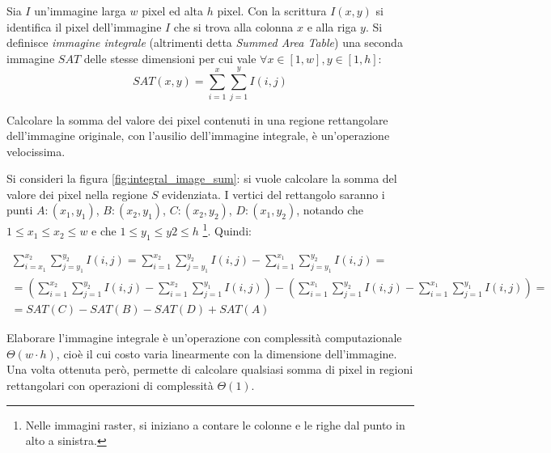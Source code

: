         \begin{definition}
            Sia $I$ un'immagine larga $w$ pixel ed alta $h$ pixel. Con la scrittura $I(x, y)$ si identifica il pixel dell'immagine $I$ che si trova alla colonna $x$ e alla riga $y$.
            Si definisce \emph{immagine integrale} (altrimenti detta \emph{Summed Area Table}) una seconda immagine $SAT$ delle stesse dimensioni per cui vale $\forall x \in [1,w], y \in [1,h]$:
            \begin{equation}
                SAT(x, y) = \sum_{i = 1}^{x} \sum_{j = 1}^{y} I(i, j)
            \end{equation}
        \end{definition}

        Calcolare la somma del valore dei pixel contenuti in una regione rettangolare dell'immagine originale, con l'ausilio dell'immagine integrale, è un'operazione velocissima.

        Si consideri la figura \ref{fig:integral_image_sum}: si vuole calcolare la somma del valore dei pixel nella regione $S$ evidenziata. I vertici del rettangolo saranno i punti $A:(x_1,y_1)$, $B:(x_2,y_1)$, $C:(x_2,y_2)$, $D:(x_1, y_2)$, notando che $1 \leq x_1 \leq x_2 \leq w$ e che $1 \leq y_1 \leq y2 \leq h$ \footnote{Nelle immagini raster, si iniziano a contare le colonne e le righe dal punto in alto a sinistra.}.
        Quindi:

        \begin{align*}
            \sum_{i = x_1}^{x_2} \sum_{j = y_1}^{y_2} I(i,j) =
            \sum_{i = 1}^{x_2} \sum_{j = y_1}^{y_2} I(i,j) - \sum_{i = 1}^{x_1} \sum_{j = y_1}^{y_2} I(i,j) = \\
            =
            \left(
            \sum_{i = 1}^{x_2} \sum_{j = 1}^{y_2} I(i,j) -
            \sum_{i = 1}^{x_2} \sum_{j = 1}^{y_1} I(i,j)
            \right)
            -
            \left(
            \sum_{i = 1}^{x_1} \sum_{j = 1}^{y_2} I(i,j) -
            \sum_{i = 1}^{x_1} \sum_{j = 1}^{y_1} I(i,j)
            \right) = \\
            = SAT(C) - SAT(B) - SAT(D) + SAT(A)
        \end{align*}

        Elaborare l'immagine integrale è un'operazione con complessità computazionale $\Theta(w \cdot h)$, cioè il cui costo varia linearmente con la dimensione dell'immagine. Una volta ottenuta però, permette di calcolare qualsiasi somma di pixel in regioni rettangolari con operazioni di complessità $\Theta(1)$.

